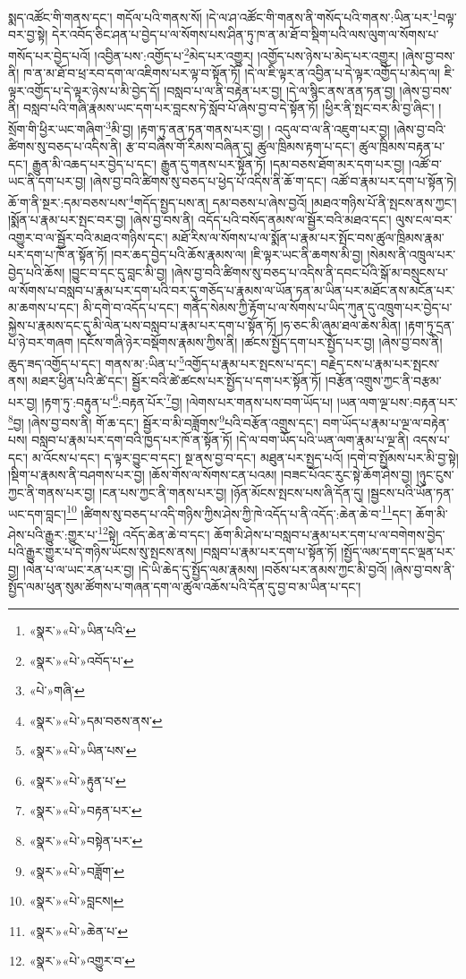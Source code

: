 སྨད་འཚོང་གི་གནས་དང་། གདོལ་པའི་གནས་སོ། །དེ་ལ་ཤ་འཚོང་གི་གནས་ནི་གསོད་པའི་གནས་:ཡིན་པར་\footnote{«སྣར་»«པེ་»ཡིན་པའི་}བལྟ་བར་བྱ་སྟེ། དེར་འབོད་ཅིང་ཤན་པ་བྱེད་པ་ལ་སོགས་པས་ཤིན་ཏུ་ཁ་ན་མ་ཐོ་བ་སྡིག་པའི་ལས་ལུག་ལ་སོགས་པ་གསོད་པར་བྱེད་པའོ། །འབྱིན་པས་:འགྱོད་པ་\footnote{«སྣར་»«པེ་»འབོད་པ་}མེད་པར་འགྱུར། །འགྱོད་པས་ཉེས་པ་མེད་པར་འགྱུར། །ཞེས་བྱ་བས་ནི། ཁ་ན་མ་ཐོ་བ་ཕྲ་རབ་དག་ལ་འཇིགས་པར་ལྟ་བ་སྟོན་ཏོ། །དེ་ལ་ཇི་ལྟར་ན་འབྱིན་པ་དེ་ལྟར་འགྱོད་པ་མེད་ལ། ཇི་ལྟར་འགྱོད་པ་དེ་ལྟར་ཉེས་པ་མི་བྱེད་དོ། །བསླབ་པ་ལ་ནི་བརྟེན་པར་བྱ། །དེ་ལ་སྙིང་ནས་ནན་ཏན་བྱ། །ཞེས་བྱ་བས་ནི། བསླབ་པའི་གཞི་རྣམས་ཡང་དག་པར་བླངས་ཏེ་སློབ་པོ་ཞེས་བྱ་བ་དེ་སྟོན་ཏོ། །ཕྱིར་ནི་སྤང་བར་མི་བྱ་ཞིང་། །སྲོག་གི་ཕྱིར་ཡང་གཞིག་\footnote{«པེ་»གཞི་}མི་བྱ། །རྟག་ཏུ་ནན་ཏན་གནས་པར་བྱ། །
འདུལ་བ་ལ་ནི་འཇུག་པར་བྱ། །ཞེས་བྱ་བའི་ཚིགས་སུ་བཅད་པ་འདིས་ནི། རྩ་བ་བཞིས་གོ་རིམས་བཞིན་དུ། ཚུལ་ཁྲིམས་རྟག་པ་དང་། ཚུལ་ཁྲིམས་བརྟན་པ་དང་། རྒྱུན་མི་འཆད་པར་བྱེད་པ་དང་། རྒྱུན་དུ་གནས་པར་སྟོན་ཏོ། །དམ་བཅས་ཐོག་མར་དག་པར་བྱ། །འཚོ་བ་ཡང་ནི་དག་པར་བྱ། །ཞེས་བྱ་བའི་ཚིགས་སུ་བཅད་པ་ཕྱེད་པོ་འདིས་ནི་ཆོ་ག་དང་། འཚོ་བ་རྣམ་པར་དག་པ་སྟོན་ཏེ། ཆོ་ག་ནི་སྔར་:དམ་བཅས་པས་\footnote{«སྣར་»«པེ་»དམ་བཅས་ནས་}གདོད་སྤྱད་པས་ན། དམ་བཅས་པ་ཞེས་བྱའོ། །མཐའ་གཉིས་པོ་ནི་སྤངས་ནས་ཀྱང་། །སྨོན་པ་རྣམ་པར་སྤང་བར་བྱ། །ཞེས་བྱ་བས་ནི། འདོད་པའི་བསོད་ནམས་ལ་སྦྱོར་བའི་མཐའ་དང་། ལུས་ངལ་བར་འགྱུར་བ་ལ་སྦྱོར་བའི་མཐའ་གཉིས་དང་། མཐོ་རིས་ལ་སོགས་པ་ལ་སྨོན་པ་རྣམ་པར་སྤོང་བས་ཚུལ་ཁྲིམས་རྣམ་པར་དག་པ་ཁོ་ན་སྟོན་ཏོ། །བར་ཆད་བྱེད་པའི་ཆོས་རྣམས་ལ། །ཇི་ལྟར་ཡང་ནི་ཆགས་མི་བྱ། །སེམས་ནི་འཁྲུལ་པར་བྱེད་པའི་ཆོས། །བྱུང་བ་དང་དུ་བླང་མི་བྱ། །ཞེས་བྱ་བའི་ཚིགས་སུ་བཅད་པ་འདིས་ནི་དབང་པོའི་སྒོ་མ་བསྲུངས་པ་ལ་སོགས་པ་བསླབ་པ་རྣམ་པར་དག་པའི་བར་དུ་གཅོད་པ་རྣམས་ལ་ཡོན་ཏན་མ་ཡིན་པར་མཐོང་ནས་མངོན་པར་མ་ཆགས་པ་དང་། མི་དགེ་བ་འདོད་པ་དང་། གནོད་སེམས་ཀྱི་རྟོག་པ་ལ་སོགས་པ་ཡིད་ཀུན་དུ་འཁྲུག་པར་བྱེད་པ་སྐྱེས་པ་རྣམས་དང་དུ་མི་ལེན་པས་བསླབ་པ་རྣམ་པར་དག་པ་སྟོན་ཏོ། །ཧ་ཅང་མི་ཞུམ་ཐལ་ཆེས་མིན། །རྟག་ཏུ་དྲན་པ་ཉེ་བར་གཞག །དངོས་གཞི་ཉེར་བསྡོགས་རྣམས་ཀྱིས་ནི། །ཚངས་སྤྱོད་དག་པར་སྤྱོད་པར་བྱ། །ཞེས་བྱ་བས་ནི། ཆུད་ཟད་འགྱོད་པ་དང་། གནས་མ་:ཡིན་པ་\footnote{«སྣར་»«པེ་»ཡིན་པས་}འགྱོད་པ་རྣམ་པར་སྤངས་པ་དང་། བརྗེད་ངས་པ་རྣམ་པར་སྤངས་ནས། མཐར་ཕྱིན་པའི་ཚེ་དང་། སྦྱོར་བའི་ཚེ་ཚངས་པར་སྤྱོད་པ་དག་པར་སྟོན་ཏོ། །བརྩོན་འགྲུས་ཀྱང་ནི་བརྩམ་པར་བྱ། །རྟག་ཏུ་:བརྟུན་པ་\footnote{«སྣར་»«པེ་»རྟུན་པ་}:བརྟན་པོར་\footnote{«སྣར་»«པེ་»བརྟན་པར་}བྱ། །ལེགས་པར་གནས་པས་བག་ཡོད་པ། །ཡན་ལག་ལྔ་པས་:བརྟན་པར་\footnote{«སྣར་»«པེ་»བསྟེན་པར་}བྱ། །ཞེས་བྱ་བས་ནི། གོ་ཆ་དང་། སྦྱོར་བ་མི་བཟློགས་\footnote{«སྣར་»«པེ་»བཟློག་}པའི་བརྩོན་འགྲུས་དང་། བག་ཡོད་པ་རྣམ་པ་ལྔ་ལ་བརྟེན་པས། བསླབ་པ་རྣམ་པར་དག་བའི་ཁྱད་པར་ཁོ་ན་སྟོན་ཏོ། །དེ་ལ་བག་ཡོད་པའི་ཡན་ལག་རྣམ་པ་ལྔ་ནི། འདས་པ་དང་། མ་འོངས་པ་དང་། ད་ལྟར་བྱུང་བ་དང་། སྔ་ནས་བྱ་བ་དང་། མཐུན་པར་སྤྱད་པའོ། །དགེ་བ་སྤྱོམས་པར་མི་བྱ་སྟེ། །སྡིག་པ་རྣམས་ནི་བཤགས་པར་བྱ། །ཆོས་གོས་ལ་སོགས་ངན་པའམ། །བཟང་པོའང་རུང་སྟེ་ཆོག་ཤེས་བྱ། །ཉུང་ངུས་ཀྱང་ནི་གནས་པར་བྱ། །ངན་པས་ཀྱང་ནི་གནས་པར་བྱ། །ཉོན་མོངས་སྤངས་པས་ཞི་དོན་དུ། །སྦྱངས་པའི་ཡོན་ཏན་ཡང་དག་བླང་།\footnote{«སྣར་»«པེ་»བླངས།} །ཚིགས་སུ་བཅད་པ་འདི་གཉིས་ཀྱིས་ཤེས་ཀྱི་ཁེ་འདོད་པ་ནི་འདོད་:ཆེན་ཆེ་བ་\footnote{«སྣར་»«པེ་»ཆེན་པ་}དང་། ཆོག་མི་ཤེས་པའི་རྒྱུར་:གྱུར་པ་\footnote{«སྣར་»«པེ་»འགྱུར་བ་}སྟེ། འདོད་ཆེན་ཆེ་བ་དང་། ཆོག་མི་ཤེས་པ་བསླབ་པ་རྣམ་པར་དག་པ་ལ་བགེགས་བྱེད་པའི་རྒྱུར་གྱུར་པ་དེ་གཉིས་ཡོངས་སུ་སྤངས་ནས། །བསླབ་པ་རྣམ་པར་དག་པ་སྟོན་ཏོ། །སྤྱོད་ལམ་དག་དང་ལྡན་པར་བྱ། །ལེན་པ་ལ་ཡང་རན་པར་བྱ། །དེ་ཡི་ཆེད་དུ་སྤྱོད་ལམ་རྣམས། །བཅོས་པར་ནམས་ཀྱང་མི་བྱའོ། །ཞེས་བྱ་བས་ནི་སྤྱོད་ལམ་ཕུན་སུམ་ཚོགས་པ་གཞན་དག་ལ་ཚུལ་འཆོས་པའི་དོན་དུ་བྱ་བ་མ་ཡིན་པ་དང་། 